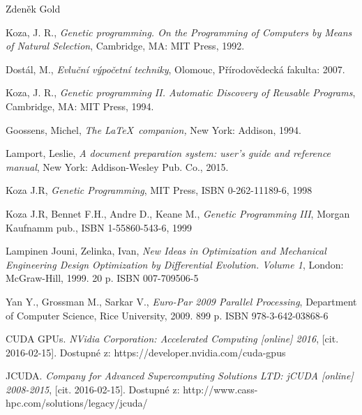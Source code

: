 \documentclass[bc,male,java,dept460]{diploma}		%
\begin{document}
\bigskip
\begin{flushright}
Zdeněk Gold
\end{flushright}

\begin{thebibliography}{99}

 Koza, J. R.,
\textit{Genetic programming. On the Programming of Computers by Means of Natural Selection},
Cambridge, MA: MIT Press, 1992.

 Dostál, M.,
\textit{Evluční výpočetní techniky},
Olomouc, Přírodovědecká fakulta: 2007.

 Koza, J. R.,
\textit{Genetic programming II. Automatic Discovery of Reusable Programs},
Cambridge, MA: MIT Press, 1994.

 Goossens, Michel,
\textit{The \LaTeX\ companion,} New York: Addison, 1994.

 Lamport, Leslie,
\textit{A document preparation system: user's guide and reference manual},
New York: Addison-Wesley Pub. Co., 2015.

 Koza J.R, 
\textit{Genetic Programming},
MIT Press, ISBN 0-262-11189-6, 1998

 Koza J.R, Bennet F.H., Andre D., Keane M.,
\textit{Genetic Programming III},
Morgan Kaufnamm pub., ISBN 1-55860-543-6, 1999

 Lampinen Jouni, Zelinka, Ivan,
\textit{New Ideas in Optimization and Mechanical Engineering Design Optimization by Differential Evolution. Volume 1},
London: McGraw-Hill, 1999. 20 p. ISBN 007-709506-5

 Yan Y., Grossman M., Sarkar V.,
\textit{Euro-Par 2009 Parallel Processing},
Department of Computer Science, Rice University, 2009. 899 p. ISBN 978-3-642-03868-6

 CUDA GPUs. 
\textit{NVidia Corporation: Accelerated Computing [online] 2016}, 
[cit. 2016-02-15]. Dostupné z: https://developer.nvidia.com/cuda-gpus

 JCUDA. 
\textit{Company for Advanced Supercomputing Solutions LTD: jCUDA [online] 2008-2015}, 
[cit. 2016-02-15]. Dostupné z: http://www.cass-hpc.com/solutions/legacy/jcuda/

\end{thebibliography}
\end{document}
